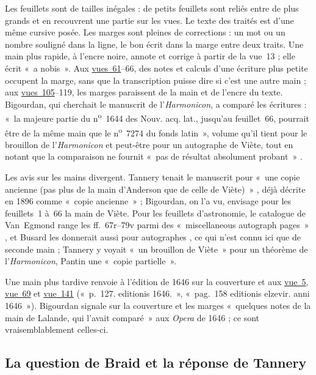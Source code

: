 \documentclass[11pt,a4paper]{article}
\theoremstyle{remark}
\newcommand{\vue}[1]{\href{https://gallica.bnf.fr/ark:/12148/btv1b10033620q/f#1.item}{vue~#1}}
\newcommand{\vues}[2]{\href{https://gallica.bnf.fr/ark:/12148/btv1b10033620q/f#1.item}{vues~#1}--#2}
\begin{document}
Les feuillets sont de tailles inégales : de petits feuillets sont reliés entre
de plus grands et en recouvrent une partie sur les vues. Le texte des traités
est d'une même cursive posée. Les marges sont pleines de corrections : un mot
ou un nombre souligné dans la ligne, le bon écrit dans la marge entre deux
traits. Une main plus rapide, à l'encre noire, annote et corrige à partir de
la vue~13 ; elle écrit «~a nobis~». Aux \vues{61}{66}, des notes et calculs
d'une écriture plus petite occupent la marge, sans que la transcription
puisse dire si c'est une autre main ; aux \vues{105}{119}, les marges
paraissent de la main et de l'encre du texte. Bigourdan, qui cherchait le
manuscrit de l'\emph{Harmonicon}, a comparé les écritures : «~la majeure
partie du n\textsuperscript{o}~1644 des Nouv. acq. lat., jusqu'au
feuillet~66, pourrait être de la même main que le n\textsuperscript{o}~7274
du fonds latin~», volume qu'il tient pour le brouillon de l'\emph{Harmonicon}
et peut-être pour un autographe de Viète, tout en notant que la comparaison
ne fournit «~pas de résultat absolument probant~»
\cite[p.~238--240]{bigourdan1916}.

Les avis sur les mains divergent. Tannery tenait le manuscrit pour «~une
copie ancienne (pas plus de la main d'Anderson que de celle de Viète)~»
\cite{tannery1902}, déjà décrite en 1896 comme «~copie ancienne~»
\cite[p.~209--210]{tannery1896} ; Bigourdan, on l'a vu, envisage pour les
feuillets~1 à~66 la main de Viète. Pour les feuillets d'astronomie, le
catalogue de Van~Egmond range les ff.~67r--79v parmi des «~miscellaneous
autograph pages~» \cite{vanegmond1985}, et Busard les donnerait aussi
pour autographes \cite{busard1964}, ce qui n'est connu ici que de
seconde main ; Tannery y voyait «~un brouillon de Viète~» pour un
théorème de l'\emph{Harmonicon}, Pantin une «~copie partielle~».

Une main plus tardive renvoie à l'édition de 1646 sur la couverture et aux
\vue{5}, \vue{69} et \vue{141} («~p.~127. editionis 1646.~», «~pag.~158
editionis elzevir. anni 1646~»). Bigourdan signale sur la couverture et les
marges «~quelques notes de la main de Lalande, qui l'avait comparé~» aux
\emph{Opera} de 1646 \cite[p.~240]{bigourdan1916} ; ce sont vraisemblablement
celles-ci.

\subsection*{La question de Braid et la réponse de Tannery}
\end{document}

